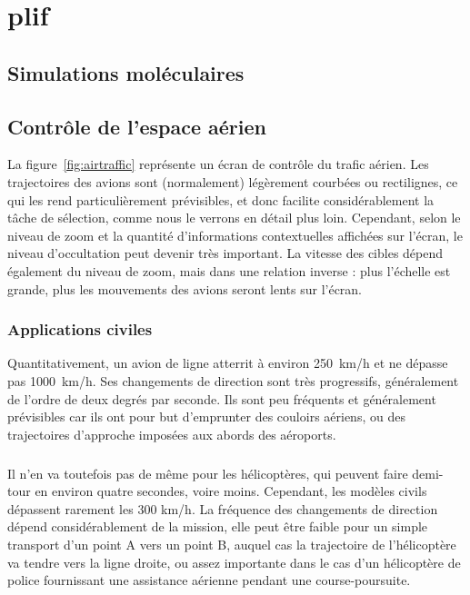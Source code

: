 
\chapter[Contexte/Besoin/Applications]{plif}
\minitoc
\label{chap1}
\cleardoublepage

	\section{Simulations moléculaires}
	
	\section{Contrôle de l'espace aérien}
	La figure~\ref{fig:airtraffic} représente un écran de contrôle du trafic aérien. Les trajectoires des avions sont (normalement) légèrement courbées ou rectilignes, ce qui les rend particulièrement prévisibles, et donc facilite considérablement la tâche de sélection, comme nous le verrons en détail plus loin. Cependant, selon le niveau de zoom et la quantité d'informations contextuelles affichées sur l'écran, le niveau d'occultation peut devenir très important. La vitesse des cibles dépend également du niveau de zoom, mais dans une relation inverse : plus l'échelle est grande, plus les mouvements des avions seront lents sur l'écran.
	
	\subsection{Applications civiles}
	Quantitativement, un avion de ligne atterrit à environ 250~km/h et ne dépasse pas 1000~km/h. Ses changements de direction sont très progressifs, généralement de l'ordre de deux degrés par seconde. Ils sont peu fréquents et généralement prévisibles car ils ont pour but d'emprunter des couloirs aériens, ou des trajectoires d'approche imposées aux abords des aéroports.

	\paragraph{}
	Il n'en va toutefois pas de même pour les hélicoptères, qui peuvent faire demi-tour en environ quatre secondes, voire moins. Cependant, les modèles civils dépassent rarement les 300 km/h. La fréquence des changements de direction dépend considérablement de la mission, elle peut être faible pour un simple transport d'un point A vers un point B, auquel cas la trajectoire de l'hélicoptère va tendre vers la ligne droite, ou assez importante dans le cas d'un hélicoptère de police fournissant une assistance aérienne pendant une course-poursuite.
	
